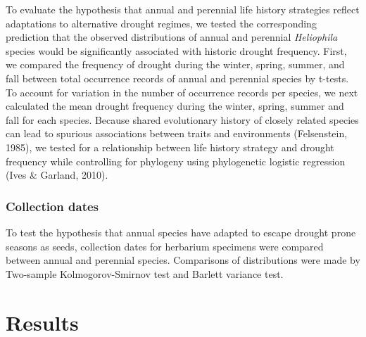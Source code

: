\documentclass[man,floatsintext]{apa6}
\theoremstyle{definition}
\theoremstyle{definition}
\theoremstyle{definition}
\theoremstyle{remark}
\begin{document}
To evaluate the hypothesis that annual and perennial life history
strategies reflect adaptations to alternative drought regimes, we tested
the corresponding prediction that the observed distributions of annual
and perennial \emph{Heliophila} species would be significantly
associated with historic drought frequency. First, we compared the
frequency of drought during the winter, spring, summer, and fall between
total occurrence records of annual and perennial species by t-tests. To
account for variation in the number of occurrence records per species,
we next calculated the mean drought frequency during the winter, spring,
summer and fall for each species. Because shared evolutionary history of
closely related species can lead to spurious associations between traits
and environments (Felsenstein, 1985), we tested for a relationship
between life history strategy and drought frequency while controlling
for phylogeny using phylogenetic logistic regression (Ives \& Garland,
2010).

\hypertarget{collection-dates}{%
\subsubsection{Collection dates}\label{collection-dates}}

To test the hypothesis that annual species have adapted to escape
drought prone seasons as seeds, collection dates for herbarium specimens
were compared between annual and perennial species. Comparisons of
distributions were made by Two-sample Kolmogorov-Smirnov test and
Barlett variance test.

\hypertarget{results}{%
\section{Results}\label{results}}
\end{document}
